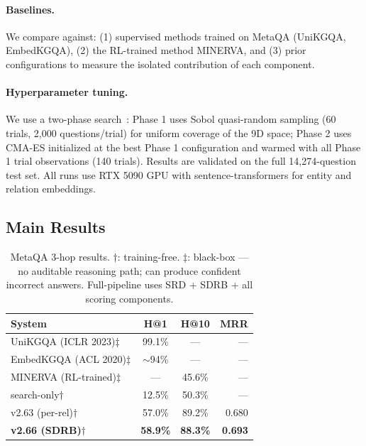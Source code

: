 \documentclass[10pt,twocolumn]{article}
\newcommand{\SDRB}{\textsc{SDRB}}
\newcommand{\SRD}{\textsc{SRD}}
\begin{document}
\paragraph{Baselines.}
We compare against: (1) supervised methods trained on MetaQA (UniKGQA, EmbedKGQA),
(2) the RL-trained method MINERVA, and (3) prior \CEREBRUM{} configurations
to measure the isolated contribution of each component.

\paragraph{Hyperparameter tuning.}
We use a two-phase search~\cite{buchorn2026report}: Phase 1 uses Sobol
quasi-random sampling (60 trials, 2,000 questions/trial) for uniform coverage
of the 9D space; Phase 2 uses CMA-ES initialized at the best Phase 1 configuration
and warmed with all Phase 1 trial observations (140 trials). Results are validated
on the full 14,274-question test set. All runs use RTX 5090 GPU with
sentence-transformers for entity and relation embeddings.

\subsection{Main Results}

\begin{table}[h]
\centering
\caption{MetaQA 3-hop results. $\dagger$: training-free. $\ddagger$: black-box ---
no auditable reasoning path; can produce confident incorrect answers.
Full-pipeline \CEREBRUM{} uses \SRD{} + \SDRB{} + all scoring components.}
\label{tab:main}
\setlength{\tabcolsep}{4pt}
\begin{tabular}{lccr}
\toprule
\textbf{System} & \textbf{H@1} & \textbf{H@10} & \textbf{MRR} \\
\midrule
UniKGQA (ICLR 2023)$\ddagger$    & 99.1\% & --- & --- \\
EmbedKGQA (ACL 2020)$\ddagger$   & $\sim$94\% & --- & --- \\
MINERVA (RL-trained)$\ddagger$   & --- & 45.6\% & --- \\
\midrule
\CEREBRUM{} search-only$\dagger$ & 12.5\% & 50.3\% & --- \\
\CEREBRUM{} v2.63 (per-rel)$\dagger$ & 57.0\% & 89.2\% & 0.680 \\
\textbf{\CEREBRUM{} v2.66 (\SDRB{})}$\dagger$ & \textbf{58.9\%} & \textbf{88.3\%} & \textbf{0.693} \\
\bottomrule
\end{tabular}
\end{table}
\end{document}
